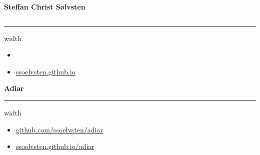 \documentclass[english, aspectratio=169]{beamer}
\begin{document}
\blankframe

\begin{frame}
  {\Large \textbf{Steffan Christ Sølvsten}}
  \begin{columns}
    \begin{column}{0.4\linewidth}
      \vspace{1pt} {\hrule width\linewidth}

      \vspace{5pt}

      \begin{itemize}
      \item[\faIcon{envelope}] 
      \item[\faIcon{globe}] \href{https://ssoelvsten.github.io}{ssoelvsten.github.io}
      \end{itemize}

      \vspace{10pt}

      {\Large \textbf{Adiar}}
      \vspace{1pt} {\hrule width\linewidth}

      \vspace{5pt}

      \begin{itemize}
      \item[\faIcon{code}]
        \href{http://github.com/ssoelvsten/adiar}{github.com/ssoelvsten/adiar}
      \item[\faIcon{book}\hspace{2pt}]
        \href{http://ssoelvsten.github.io/adiar}{ssoelvsten.github.io/adiar}
      \end{itemize}

      \vspace{10pt}


\end{column}
\end{columns}
\end{frame}
\end{document}
